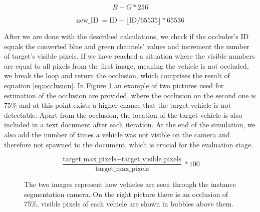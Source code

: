 \begin{equation}B + G * 256\label{eq:instance}\end{equation}

\begin{equation}\textrm{new\_ID} \: = \textrm{ID} - \lfloor \textrm{ID} / 65535 \rfloor * 65536\label{eq:new_id}\end{equation}

After we are done with the described calculations, we check if the occluder's ID equals the converted blue and green channels' values and increment the number of target's visible pixels. If we have reached a situation where the visible numbers are equal to all pixels from the first image, meaning the vehicle is not occluded, we break the loop and return the occlusion, which comprises the result of equation \ref{eq:occlusion}. In Figure \ref{fig:occlusion_calc} an example of two pictures used for estimation of the occlusion are provided, where the occlusion on the second one is 75\% and at this point exists a higher chance that the target vehicle is not detectable. Apart from the occlusion, the location of the target vehicle is also included in a text document after each iteration. At the end of the simulation, we also add the number of times a vehicle was not visible on the camera and therefore not spawned to the document, which is crucial for the evaluation stage.  

\begin{equation}
    \frac{\textrm{target\_max\_pixels} - \textrm{target\_visible\_pixels}}{\textrm{target\_max\_pixels}} * 100 \label{eq:occlusion}
\end{equation}

\begin{figure} [h!]
  \centering
  \hfill
  \caption[Calculation of an occlusion]{The two images represent how vehicles are seen through the instance segmentation camera. On the right picture there is an occlusion of 75\%, visible pixels of each vehicle are shown in bubbles above them.} \label{fig:occlusion_calc}
\end{figure}
 
